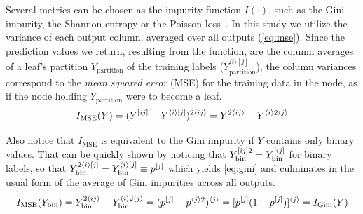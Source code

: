 Several metrics can be chosen as the impurity function $I(\cdot)$, such as the Gini impurity, the Shannon entropy or the Poisson loss~\cite{}. In this study we utilize the variance of each output column, averaged over all outputs (\autoref{eq:mse}). Since the prediction values we return, resulting from the  function, are the column averages of a leaf's partition $Y_\text{partition}$ of the training labels ($Y_\text{partition}^{\langle i\rangle[j]}$), the column variances correspond to the \emph{mean squared error} (MSE) for the training data in the node, as if the node holding $Y_\text{partition}$ were to become a leaf.
%
\begin{equation}
    I_\text{MSE}(Y)
        = (Y^{[ij]} - Y^{\langle i\rangle[j]})^{2\langle ij\rangle}
        = Y^{2\langle ij\rangle} - Y^{\langle i\rangle 2\langle j\rangle}
    \label{eq:mse}
\end{equation}
%
%

Also notice that $I_\text{MSE}$ is equivalent to the Gini impurity if $Y$ contains only binary values. That can be quickly shown by noticing that $Y_\text{bin}^{[ij]2} = Y_\text{bin}^{[ij]}$ for binary labels, so that $Y_\text{bin}^{2\langle i\rangle[j]}=Y_\text{bin}^{\langle i\rangle [j]}\equiv p^{[j]}$ which yields \autoref{eq:gini} and culminates in the usual form of the average of Gini impurities across all outputs.
%
\begin{equation}
    I_\text{MSE}(Y_\text{bin})
        = Y_\text{bin}^{2\langle ij\rangle} - Y_\text{bin}^{\langle i\rangle2\langle j\rangle}
        = (p^{[j]}  - p^{\langle j\rangle 2})^{\langle j \rangle}
        = [p^{[j]}(1 - p^{[j]})]^{\langle j \rangle}
    = I_\text{Gini}(Y)
    \label{eq:gini}
\end{equation}

